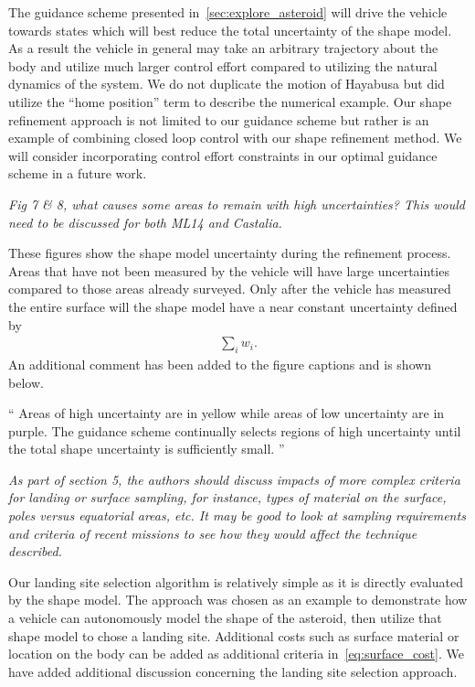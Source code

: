 \documentclass[11pt]{article}
\newenvironment{correction}{\begin{list}{}{\setlength{\leftmargin}{1cm}\setlength{\rightmargin}{1cm}}\vspace{\parsep}\item[]``}{''\end{list}}
\newcommand{\comment}[1]{\item \itshape #1 \normalfont}
\begin{document}
\begin{itemize}
The guidance scheme presented in~\cref{sec:explore_asteroid} will drive the vehicle towards states which will best reduce the total uncertainty of the shape model.
As a result the vehicle in general may take an arbitrary trajectory about the body and utilize much larger control effort compared to utilizing the natural dynamics of the system. 
We do not duplicate the motion of Hayabusa but did utilize the ``home position'' term to describe the numerical example.
Our shape refinement approach is not limited to our guidance scheme but rather is an example of combining closed loop control with our shape refinement method.
We will consider incorporating control effort constraints in our optimal guidance scheme in a future work.

\comment{
Fig 7 \& 8, what causes some areas to remain with high uncertainties? This would need to be discussed for both ML14 and Castalia.
}

These figures show the shape model uncertainty during the refinement process.
Areas that have not been measured by the vehicle will have large uncertainties compared to those areas already surveyed. 
Only after the vehicle has measured the entire surface will the shape model have a near constant uncertainty defined by 
\begin{align*}
    \sum_i w_i.
\end{align*}
An additional comment has been added to the figure captions and is shown below.

\begin{correction}
    Areas of high uncertainty are in yellow while areas of low uncertainty are in purple.
    The guidance scheme continually selects regions of high uncertainty until the total shape uncertainty is sufficiently small.
\end{correction}

\comment{
As part of section 5, the authors should discuss impacts of more complex criteria for landing or surface sampling, for instance, types of material on the surface, poles versus equatorial areas, etc. 
It may be good to look at sampling requirements and criteria of recent missions to see how they would affect the technique described.
}

Our landing site selection algorithm is relatively simple as it is directly evaluated by the shape model.
The approach was chosen as an example to demonstrate how a vehicle can autonomously model the shape of the asteroid, then utilize that shape model to chose a landing site. 
Additional costs such as surface material or location on the body can be added as additional criteria in~\cref{eq:surface_cost}.
We have added additional discussion concerning the landing site selection approach.


\end{itemize}
\end{document}
